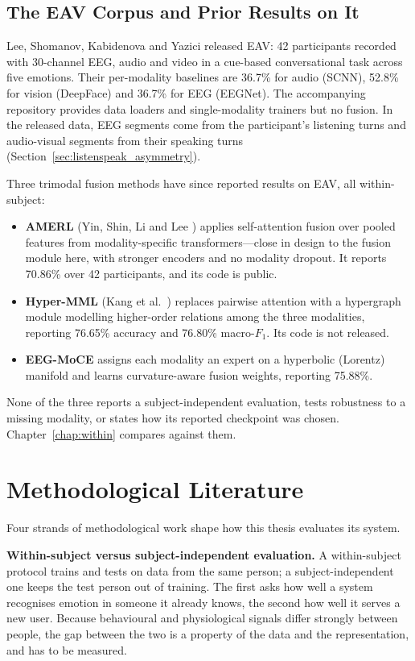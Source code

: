 \subsection{The EAV Corpus and Prior Results on It}
Lee, Shomanov, Kabidenova and Yazici \cite{Lee2024EAV} released EAV: 42 participants recorded with 30-channel EEG, audio and video in a cue-based conversational task across five emotions. Their per-modality baselines are 36.7\% for audio (SCNN), 52.8\% for vision (DeepFace) and 36.7\% for EEG (EEGNet). The accompanying repository provides data loaders and single-modality trainers but no fusion. In the released data, EEG segments come from the participant's listening turns and audio-visual segments from their speaking turns (Section~\ref{sec:listenspeak_asymmetry}).

Three trimodal fusion methods have since reported results on EAV, all within-subject:
\begin{itemize}
    \item \textbf{AMERL} (Yin, Shin, Li and Lee \cite{Yin2024AMERL}) applies self-attention fusion over pooled features from modality-specific transformers---close in design to the fusion module here, with stronger encoders and no modality dropout. It reports 70.86\% over 42 participants, and its code is public.
    \item \textbf{Hyper-MML} (Kang et al.\ \cite{Kang2025HyperMML}) replaces pairwise attention with a hypergraph module modelling higher-order relations among the three modalities, reporting 76.65\% accuracy and 76.80\% macro-$F_1$. Its code is not released.
    \item \textbf{EEG-MoCE} \cite{Anon2026EEGMoCE} assigns each modality an expert on a hyperbolic (Lorentz) manifold and learns curvature-aware fusion weights, reporting 75.88\%.
\end{itemize}
None of the three reports a subject-independent evaluation, tests robustness to a missing modality, or states how its reported checkpoint was chosen. Chapter~\ref{chap:within} compares against them.

\section{Methodological Literature}
\label{sec:lit_evaluation}

Four strands of methodological work shape how this thesis evaluates its system.

\textbf{Within-subject versus subject-independent evaluation.} A within-subject protocol trains and tests on data from the same person; a subject-independent one keeps the test person out of training. The first asks how well a system recognises emotion in someone it already knows, the second how well it serves a new user. Because behavioural and physiological signals differ strongly between people, the gap between the two is a property of the data and the representation, and has to be measured.


